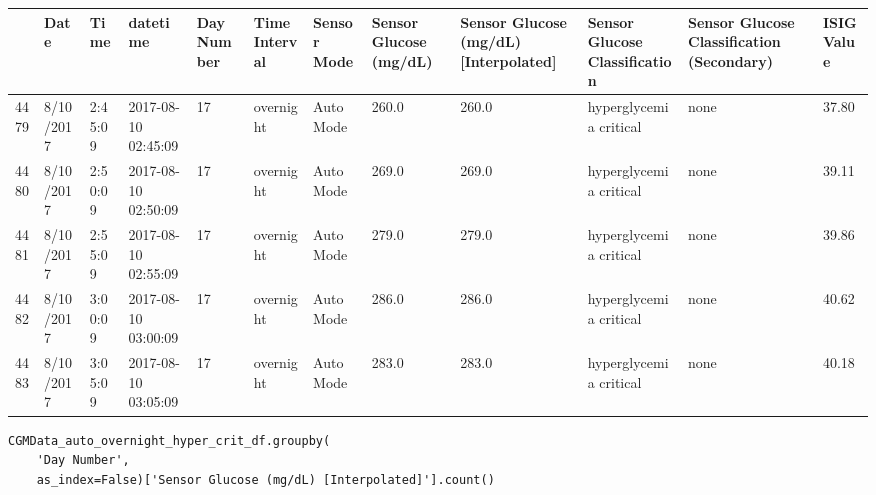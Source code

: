 \bigskip\noindent
\begin{tabular}{p{}p{}p{}p{}p{}p{}p{}p{}p{}p{}p{}p{}}
\toprule
 & Date & Time & datetime & Day Number & Time Interval & Sensor Mode & Sensor Glucose (mg/dL) & Sensor Glucose (mg/dL) [Interpolated] & Sensor Glucose Classification & Sensor Glucose Classification (Secondary) & ISIG Value \\
\hline
4479 & 8/10/2017 & 2:45:09 & 2017-08-10 02:45:09 & 17 & overnight & Auto Mode & 260.0 & 260.0 & hyperglycemia critical & none & 37.80 \\
\hline
4480 & 8/10/2017 & 2:50:09 & 2017-08-10 02:50:09 & 17 & overnight & Auto Mode & 269.0 & 269.0 & hyperglycemia critical & none & 39.11 \\
\hline
4481 & 8/10/2017 & 2:55:09 & 2017-08-10 02:55:09 & 17 & overnight & Auto Mode & 279.0 & 279.0 & hyperglycemia critical & none & 39.86 \\
\hline
4482 & 8/10/2017 & 3:00:09 & 2017-08-10 03:00:09 & 17 & overnight & Auto Mode & 286.0 & 286.0 & hyperglycemia critical & none & 40.62 \\
\hline
4483 & 8/10/2017 & 3:05:09 & 2017-08-10 03:05:09 & 17 & overnight & Auto Mode & 283.0 & 283.0 & hyperglycemia critical & none & 40.18 \\
\hline
\bottomrule
\end{tabular}

\bigskip

\begin{verbatim}
CGMData_auto_overnight_hyper_crit_df.groupby(
    'Day Number', 
    as_index=False)['Sensor Glucose (mg/dL) [Interpolated]'].count()
\end{verbatim}

